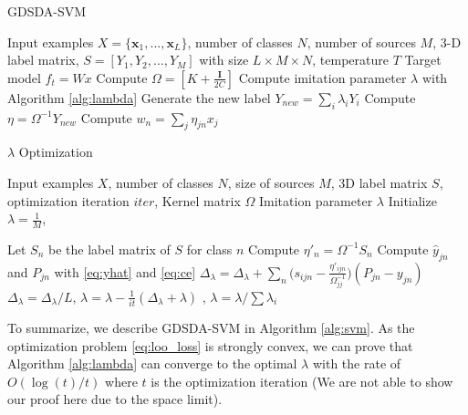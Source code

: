 \begin{algorithm}[t]
	\caption{GDSDA-SVM}\label{alg:svm}
	\begin{algorithmic}
		\REQUIRE Input examples $X=\{\textbf{x}_1,...,\textbf{x}_L\}$, number of classes $N$, number of sources $M$, 3-D label matrix, $S=[Y_1,Y_2,...,Y_{M}]$ with size $L\times M \times N$, temperature $T$ %
		\ENSURE Target model $f_t = Wx$
		\STATE Compute $\Omega=[K+\frac{\mathbf{I}}{2C}]$
		\STATE Compute imitation parameter $\lambda$ with Algorithm \ref{alg:lambda}
		\STATE Generate the new label $Y_{new}=\sum_i\lambda_iY_i$
		\STATE Compute $\eta = \Omega^{-1}Y_{new}$
		\STATE Compute $w_n = \sum_j \eta_{jn}x_j$
	\end{algorithmic}	
\end{algorithm}
\begin{algorithm}[t]
	\caption{$\lambda$ Optimization}\label{alg:lambda}
\begin{algorithmic}
	\REQUIRE Input examples $X$, number of classes $N$, size of sources $M$, 3D label matrix $S$,  optimization iteration $iter$, Kernel matrix $\Omega$
    \ENSURE Imitation parameter $\lambda$
    \STATE Initialize $\lambda = \frac{1}{M}$, 
    
    \STATE Let $S_n$ be the label matrix of $S$ for class $n$
    \STATE Compute $\eta'_n=\Omega^{-1}S_n$ 
    \ENDFOR
	    \STATE Compute $\hat{y}_{jn}$ and $P_{jn}$ with \eqref{eq:yhat}  and \eqref{eq:ce}
	    \FOR {each $\textbf{x}_j$ in $X$}
		    \STATE $\Delta_{\lambda} = \Delta_{\lambda}+\sum_n\bigg(s_{ijn}-\frac{{\eta}'_{ijn}}{\Omega_{jj}^{-1}}\bigg)\left(P_{jn}-{y}_{jn}\right)$
	    \ENDFOR
	    \STATE $\Delta_{\lambda} =\Delta_{\lambda}/L$, $\lambda = \lambda - \frac{1}{it}(\Delta_{\lambda}+\lambda)$
	    , $\lambda = \lambda / \sum\lambda_i$
    \ENDFOR
\end{algorithmic}	
\end{algorithm}

To summarize, we describe GDSDA-SVM in Algorithm \ref{alg:svm}. As the optimization problem \eqref{eq:loo_loss} is strongly convex, we can prove that Algorithm \ref{alg:lambda} can converge to the optimal $\lambda$ with the rate of $O(\log(t)/t)$ where $t$ is the optimization iteration (We are not able to show our proof here due to the space limit). 





